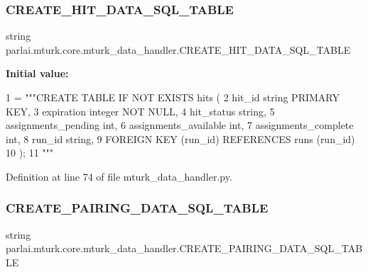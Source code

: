 \subsubsection{\texorpdfstring{C\+R\+E\+A\+T\+E\+\_\+\+H\+I\+T\+\_\+\+D\+A\+T\+A\+\_\+\+S\+Q\+L\+\_\+\+T\+A\+B\+LE}{CREATE\_HIT\_DATA\_SQL\_TABLE}}
{\footnotesize\ttfamily string parlai.\+mturk.\+core.\+mturk\+\_\+data\+\_\+handler.\+C\+R\+E\+A\+T\+E\+\_\+\+H\+I\+T\+\_\+\+D\+A\+T\+A\+\_\+\+S\+Q\+L\+\_\+\+T\+A\+B\+LE}

{\bfseries Initial value\+:}
\begin{DoxyCode}
1 =  \textcolor{stringliteral}{"""CREATE TABLE IF NOT EXISTS hits (}
2 \textcolor{stringliteral}{        hit\_id string PRIMARY KEY,}
3 \textcolor{stringliteral}{        expiration integer NOT NULL,}
4 \textcolor{stringliteral}{        hit\_status string,}
5 \textcolor{stringliteral}{        assignments\_pending int,}
6 \textcolor{stringliteral}{        assignments\_available int,}
7 \textcolor{stringliteral}{        assignments\_complete int,}
8 \textcolor{stringliteral}{        run\_id string,}
9 \textcolor{stringliteral}{        FOREIGN KEY (run\_id) REFERENCES runs (run\_id)}
10 \textcolor{stringliteral}{    );}
11 \textcolor{stringliteral}{    """}
\end{DoxyCode}


Definition at line 74 of file mturk\+\_\+data\+\_\+handler.\+py.

\mbox{\label{namespaceparlai_1_1mturk_1_1core_1_1mturk__data__handler_a8a16e3b7640699a3abec2eec3d20dbd1}} 
\subsubsection{\texorpdfstring{C\+R\+E\+A\+T\+E\+\_\+\+P\+A\+I\+R\+I\+N\+G\+\_\+\+D\+A\+T\+A\+\_\+\+S\+Q\+L\+\_\+\+T\+A\+B\+LE}{CREATE\_PAIRING\_DATA\_SQL\_TABLE}}
{\footnotesize\ttfamily string parlai.\+mturk.\+core.\+mturk\+\_\+data\+\_\+handler.\+C\+R\+E\+A\+T\+E\+\_\+\+P\+A\+I\+R\+I\+N\+G\+\_\+\+D\+A\+T\+A\+\_\+\+S\+Q\+L\+\_\+\+T\+A\+B\+LE}

